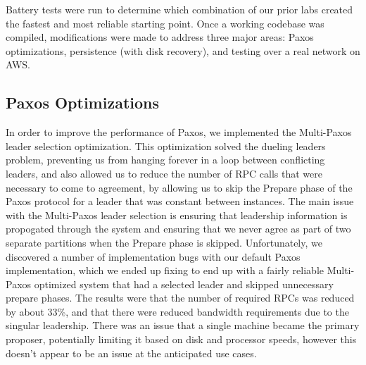 \documentclass[letterpaper,10pt]{article}
\begin{document}
Battery tests were run to determine which combination of our prior
labs created the fastest and most reliable starting point.  Once a
working codebase was compiled, modifications were made to address
three major areas: Paxos optimizations, persistence (with disk
recovery), and testing over a real network on AWS.

\subsection{Paxos Optimizations}
In order to improve the performance of Paxos, we implemented the
Multi-Paxos leader selection optimization. This optimization solved
the dueling leaders problem, preventing us from hanging forever in a
loop between conflicting leaders, and also allowed us to reduce the
number of RPC calls that were necessary to come to agreement, by
allowing us to skip the Prepare phase of the Paxos protocol for a
leader that was constant between instances. The main issue with the
Multi-Paxos leader selection is ensuring that leadership information
is propogated through the system and ensuring that we never agree as
part of two separate partitions when the Prepare phase is
skipped. Unfortunately, we discovered a number of implementation bugs
with our default Paxos implementation, which we ended up fixing to end
up with a fairly reliable Multi-Paxos optimized system that had a
selected leader and skipped unnecessary prepare phases. The results
were that the number of required RPCs was reduced by about 33\%, and
that there were reduced bandwidth requirements due to the singular
leadership. There was an issue that a single machine became the
primary proposer, potentially limiting it based on disk and processor
speeds, however this doesn't appear to be an issue at the anticipated
use cases.
\end{document}
